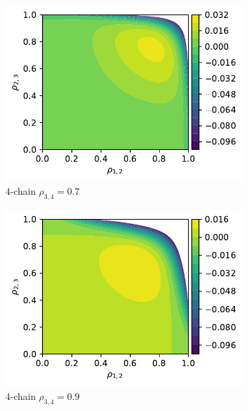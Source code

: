 \documentclass[../Thesis.tex]{subfiles}
\begin{document}
\begin{figure}[H]
    \centering
    \begin{subfigure}[t]{0.49\textwidth}
        \centering
        \includegraphics[width=.95\linewidth]{figures/Gaussian Chain Theoretical/3 chain error - MI - rho3 0_7.pdf}
        \caption{$4$-chain $\rho_{3,4} = 0.7$}
    \end{subfigure}
    \hfill
    \begin{subfigure}[t]{0.49\textwidth}
        \centering
        \includegraphics[width=.95\linewidth]{figures/Gaussian Chain Theoretical/3 chain error - MI - rho3 0_9.pdf}
        \caption{$4$-chain $\rho_{3,4} = 0.9$}
    \end{subfigure}
    \\[\baselineskip]
    \begin{subfigure}[t]{0.49\textwidth}

\end{subfigure}
\end{figure}
\end{document}
